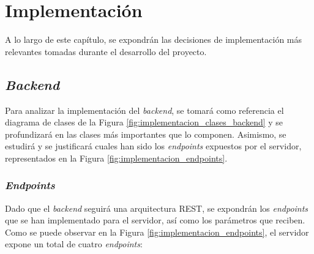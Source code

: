 \chapter{Implementación}
\label{chap:implementacion}

A lo largo de este capítulo, se expondrán las decisiones de implementación más relevantes tomadas durante el desarrollo del proyecto.

\section{\textit{Backend}}

Para analizar la implementación del \textit{backend}, se tomará como referencia el diagrama de clases de la Figura \ref{fig:implementacion_clases_backend} y se profundizará
en las clases más importantes que lo componen. Asimismo, se estudirá y se justificará cuales han sido los \textit{endpoints} expuestos por el servidor,
representados en la Figura \ref{fig:implementacion_endpoints}.

\subsection{\textit{Endpoints}}

Dado que el \textit{backend} seguirá una arquitectura REST, se expondrán los \textit{endpoints} que se han implementado para el servidor, así como los parámetros
que reciben. Como se puede observar en la Figura \ref{fig:implementacion_endpoints}, el servidor expone un total de cuatro \textit{endpoints}:

